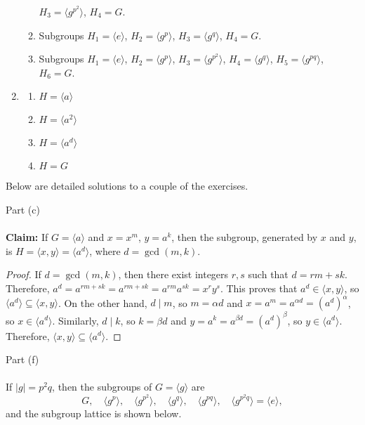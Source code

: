 \documentclass[12pt]{article}
\newcommand{\order}[1]{\ensuremath{|#1|}}
\newcommand{\divides}{\ensuremath{\mid}}
\newcommand{\<}{\ensuremath{\langle}}
\renewcommand{\>}{\ensuremath{\rangle}}
\theoremstyle{plain}
\theoremstyle{definition}
\begin{document}
\begin{enumerate}
\begin{enumerate}
$H_3=\langle g^{p^2}\rangle$, $H_4=G$.
\item Subgroups $H_1=\langle e\rangle$, $H_2=\langle g^p\rangle$,
$H_3=\langle g^{q}\rangle$, $H_4=G$.
\item Subgroups 
$H_1=\langle e\rangle$, $H_2=\langle g^p\rangle$,
$H_3=\langle g^{p^2}\rangle$, $H_4=\langle g^q\rangle$, 
$H_5=\langle g^{pq}\rangle$,  $H_6=G$.
\end{enumerate}
\item \label{item:1}
\begin{enumerate}
\item $H=\langle a\rangle$
\item $H=\langle a^2\rangle$
\item $H=\langle a^d\rangle$
\item $H=G$
\end{enumerate}
\end{enumerate}

\newpage

\pagestyle{fancy} \lhead{\bf } 
\rhead{} \lfoot{} \cfoot{\thepage} \rfoot{}

\noindent Below are detailed solutions to a couple of the exercises.

\medskip

 Part (c)\\
\\
{\bf Claim:}
If $G = \<a\>$ and $x = x^m$, $y = a^k$, then the subgroup, 
generated by $x$ and $y$, is 
$H = \<x, y\> = \<a^d\>$, where $d = \gcd(m, k)$.
\begin{proof}
If $d = \gcd(m, k)$, then there exist integers $r, s$ such that 
$d = rm + sk$.  Therefore, 
$a^d = a^{rm + sk} = a^{rm + sk} = a^{rm}a^{sk} =  x^ry^s$. This proves that
$a^d \in \<x, y\>$, so 
$\<a^d\> \subseteq \<x, y\>$. On the other hand, 
$d\divides m$, so
$m = \alpha d$ and $x = a^m = a^{\alpha d} = (a^d)^\alpha$, so 
$x\in \<a^d\>$.  
Similarly, $d\divides k$, so $k = \beta d$ 
and $y = a^k = a^{\beta d} = (a^d)^\beta$, so
$y\in \<a^d\>$.  Therefore, $\<x, y\> \subseteq \<a^d\>$.
\end{proof}

\bigskip

 Part (f)\\
\\
If $\order{g}=p^2q$, then the subgroups of $G= \<g\>$ are
\[
G, \quad
\<g^p\>, \quad 
\<g^{p^2}\>, \quad 
\<g^q\>, \quad 
\<g^{pq}\>, \quad 
\<g^{p^2q}\> = \<e\>,
\]
and the subgroup lattice is shown below.
\end{document}
